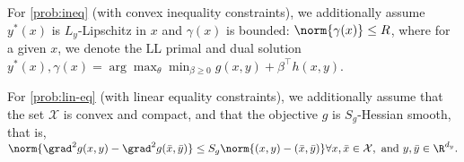 \begin{assumption}\label{item:assumption_safe_constraints} 
For \cref{prob:ineq} (with convex inequality constraints), we additionally assume $y^*(x)$ is $L_y$-Lipschitz in $x$ and $\gamma(x)$ is  bounded: $\norm{\gamma(x)} \leq R$, where for a given $x$, we denote the LL primal and dual solution $y^*(x), \gamma(x) = \arg\max\nolimits_\theta \min\nolimits_{\beta \geq 0} g(x,y) + \beta^\top h(x,y)$. %
\end{assumption}

\begin{assumption}\label{assumption:eq}For \cref{prob:lin-eq} (with linear equality constraints), we additionally assume that the set $\mathcal{X}$ is convex and compact, and that the objective $g$ is $S_g$-Hessian smooth, that is, $\norm{\grad^2 g(x,y) -\grad^2 g(\bar x,\bar y)}\leq S_g \norm{(x,y) - (\bar x, \bar y)} \forall x,\bar x \in \mathcal{X}, \text{ and } y, \bar y \in \R^{d_y}.$
\end{assumption}

